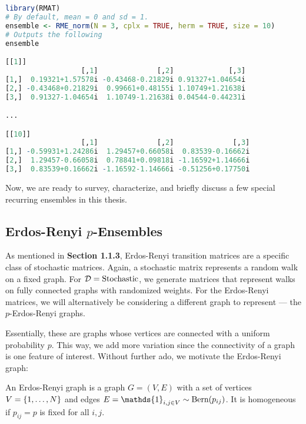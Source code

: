 \begin{lstlisting}[language=R]
library(RMAT)
# By default, mean = 0 and sd = 1.
ensemble <- RME_norm(N = 3, cplx = TRUE, herm = TRUE, size = 10)
# Outputs the following
ensemble

[[1]]
                  [,1]              [,2]             [,3]
[1,]  0.19321+1.57578i -0.43468-0.21829i 0.91327+1.04654i
[2,] -0.43468+0.21829i  0.99661+0.48155i 1.10749+1.21638i
[3,]  0.91327-1.04654i  1.10749-1.21638i 0.04544-0.44231i

...

[[10]]
                  [,1]              [,2]              [,3]
[1,] -0.59931+1.24286i  1.29457+0.66058i  0.83539-0.16662i
[2,]  1.29457-0.66058i  0.78841+0.09818i -1.16592+1.14666i
[3,]  0.83539+0.16662i -1.16592-1.14666i -0.51256+0.17750i
\end{lstlisting}

Now, we are ready to survey, characterize, and briefly discuss a few special recurring ensembles in this thesis.

\newpage


\subsection{Erdos-Renyi $p$-Ensembles}

As mentioned in \textbf{Section 1.1.3}, Erdos-Renyi transition matrices are a specific class of stochastic matrices.
Again, a stochastic matrix represents a random walk on a fixed graph. For $\D = \text{Stochastic}$, we generate matrices that represent walks on fully connected graphs with randomized weights.
For the Erdos-Renyi matrices, we will alternatively be considering a different graph to represent --- the $p$-Erdos-Renyi graphs.

Essentially, these are graphs whose vertices are connected with a uniform probability $p$.
This way, we add more variation since the connectivity of a graph is one feature of interest.
Without further ado, we motivate the Erdos-Renyi graph:

\begin{definition}
An Erdos-Renyi graph is a graph $G = (V,E)$ with a set of vertices $V = \{\oneto[N]\}$ and edges $E = \mathds{1}_{i,j \in V} \sim \Bern(p_{ij})$. It is homogeneous if $p_{ij} = p$ is fixed for all $i, j$.
\end{definition}

